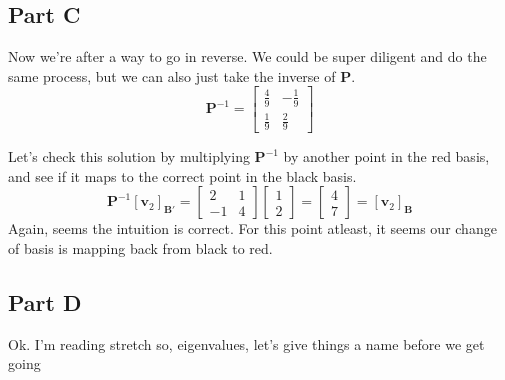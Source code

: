 \documentclass{article}
\begin{document}
        \subsection{Part C}
            Now we're after a way to go in reverse. We could be super diligent
            and do the same process, but we can also just take the inverse of
            $\mathbf{P}$.
            \[
                \mathbf{P}^{-1}
                =
                \begin{bmatrix}
                    \frac{4}{9} & -\frac{1}{9} \\
                    \frac{1}{9} & \frac{2}{9}
                \end{bmatrix}
            \]
            \begin{solutioncheck}
                Let's check this solution by multiplying $\mathbf{P}^{-1}$ by
                another point in the red basis, and see if it maps to the correct point in the black basis.
                \[
                    \mathbf{P}^{-1}[\mathbf{v}_2]_{\mathbf{B}'}
                    =
                    \begin{bmatrix}
                        2 & 1\\
                        -1 & 4
                    \end{bmatrix}
                    \begin{bmatrix}
                        1\\2
                    \end{bmatrix}
                    =
                    \begin{bmatrix}
                        4\\7
                    \end{bmatrix}
                    =
                    [\mathbf{v}_2]_{\mathbf{B}}
                \]
                Again, seems the intuition is correct. For this point atleast,
                it seems our change of basis is mapping back from black to red.
            \end{solutioncheck}
        \subsection{Part D}
            Ok. I'm reading stretch so, eigenvalues, let's give things a name before we get going
\end{document}
